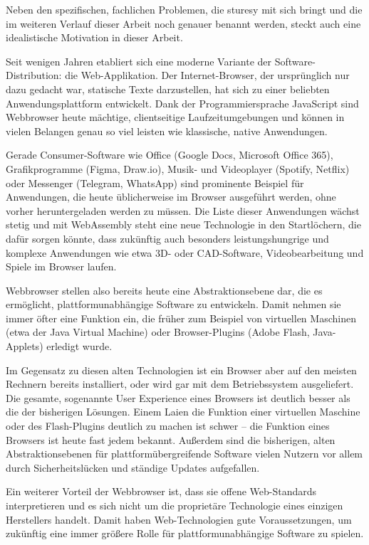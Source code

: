 Neben den spezifischen, fachlichen Problemen, die \ac{sturesy} mit sich bringt und die im weiteren Verlauf dieser Arbeit noch genauer benannt werden, steckt auch eine idealistische Motivation in dieser Arbeit.

Seit wenigen Jahren etabliert sich eine moderne Variante der Software-Distribution: die Web-Applikation. Der Internet-Browser, der ursprünglich nur dazu gedacht war, statische Texte darzustellen, hat sich zu einer beliebten Anwendungsplattform entwickelt. Dank der Programmiersprache JavaScript sind Webbrowser heute mächtige, clientseitige Laufzeitumgebungen und können in vielen Belangen genau so viel leisten wie klassische, native Anwendungen.

Gerade Consumer-Software wie Office (Google Docs, Microsoft Office 365), Grafikprogramme (Figma, Draw.io), Musik- und Videoplayer (Spotify, Netflix) oder Messenger (Telegram, WhatsApp) sind prominente Beispiel für Anwendungen, die heute üblicherweise im Browser ausgeführt werden, ohne vorher heruntergeladen werden zu müssen. Die Liste dieser Anwendungen wächst stetig und mit WebAssembly steht eine neue Technologie in den Startlöchern, die dafür sorgen könnte, dass zukünftig auch besonders leistungshungrige und komplexe Anwendungen wie etwa 3D- oder CAD-Software, Videobearbeitung und Spiele im Browser laufen.

Webbrowser stellen also bereits heute eine Abstraktionsebene dar, die es ermöglicht, plattformunabhängige Software zu entwickeln. Damit nehmen sie immer öfter eine Funktion ein, die früher zum Beispiel von virtuellen Maschinen (etwa der Java Virtual Machine) oder Browser-Plugins (Adobe Flash, Java-Applets) erledigt wurde.

Im Gegensatz zu diesen alten Technologien ist ein Browser aber auf den meisten Rechnern bereits installiert, oder wird gar mit dem Betriebssystem ausgeliefert. Die gesamte, sogenannte User Experience eines Browsers ist deutlich besser als die der bisherigen Lösungen. Einem Laien die Funktion einer virtuellen Maschine oder des Flash-Plugins deutlich zu machen ist schwer – die Funktion eines Browsers ist heute fast jedem bekannt. Außerdem sind die bisherigen, alten Abstraktionsebenen für plattformübergreifende Software vielen Nutzern vor allem durch Sicherheitslücken und ständige Updates aufgefallen.

Ein weiterer Vorteil der Webbrowser ist, dass sie offene Web-Standards interpretieren und es sich nicht um die proprietäre Technologie eines einzigen Herstellers handelt. Damit haben Web-Technologien gute Voraussetzungen, um zukünftig eine immer größere Rolle für plattformunabhängige Software zu spielen.

